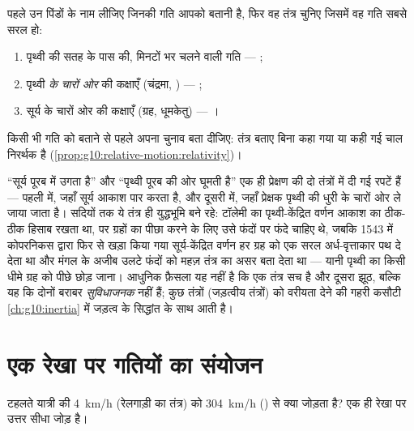 \begin{method}[तंत्र चुनना]\label{met:g10:relative-motion:choose}
पहले उन पिंडों के नाम लीजिए जिनकी गति आपको बतानी है, फिर वह तंत्र चुनिए
जिसमें वह गति सबसे सरल हो:
\begin{enumerate}
  \item पृथ्वी की सतह के पास की, मिनटों भर चलने वाली गति ---
        ;
  \item पृथ्वी \emph{के चारों ओर} की कक्षाएँ (चंद्रमा,
        ) --- ;
  \item सूर्य के चारों ओर की कक्षाएँ (ग्रह, धूमकेतु) ---
        ।
\end{enumerate}
किसी भी गति को बताने से पहले अपना चुनाव बता दीजिए: तंत्र बताए बिना कहा
गया  या कही गई चाल निरर्थक है (\cref{prop:g10:relative-motion:relativity})।
\end{method}

\begin{remark}[कौन सही है, टॉलेमी या कोपरनिकस?]\label{rem:g10:relative-motion:history}
``सूर्य पूरब में उगता है'' और ``पृथ्वी पूरब की ओर घूमती है'' एक ही
प्रेक्षण की दो तंत्रों में दी गई रपटें हैं --- पहली  में, जहाँ सूर्य आकाश पार करता है, और दूसरी  में, जहाँ प्रेक्षक पृथ्वी की धुरी के चारों ओर ले जाया जाता है।
सदियों तक ये तंत्र ही युद्धभूमि बने रहे: टॉलेमी का पृथ्वी-केंद्रित वर्णन
आकाश का ठीक-ठीक हिसाब रखता था, पर ग्रहों का पीछा करने के लिए उसे फंदों
पर फंदे चाहिए थे, जबकि 1543 में कोपरनिकस द्वारा फिर से खड़ा किया गया
सूर्य-केंद्रित वर्णन हर ग्रह को एक सरल अर्ध-वृत्ताकार पथ दे देता था और
मंगल के अजीब उलटे फंदों को महज़ तंत्र का असर बता देता था --- यानी पृथ्वी
का किसी धीमे ग्रह को पीछे छोड़ जाना। आधुनिक फ़ैसला यह नहीं है कि एक
तंत्र सच है और दूसरा झूठ, बल्कि यह कि दोनों बराबर \emph{सुविधाजनक} नहीं
हैं; कुछ तंत्रों (जड़त्वीय तंत्रों) को वरीयता देने की गहरी कसौटी \cref{ch:g10:inertia}
में जड़त्व के सिद्धांत के साथ आती है।
\end{remark}

\section{एक रेखा पर गतियों का संयोजन}

टहलते यात्री की \qty{4}{km/h} (रेलगाड़ी का तंत्र) को \qty{304}{km/h} () से क्या जोड़ता है? एक ही रेखा पर उत्तर सीधा जोड़ है।

